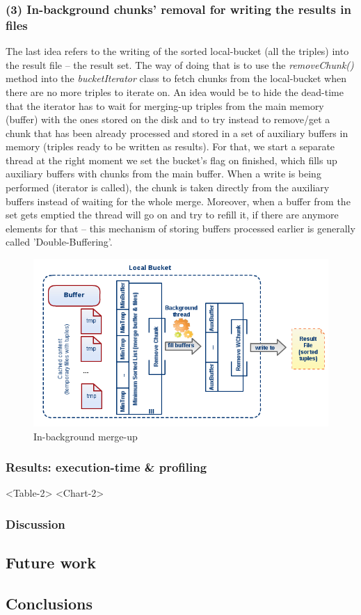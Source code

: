 % 
\subsubsection*{(3) In-background chunks' removal for writing the results in files}

The last idea refers to the writing of the sorted local-bucket (all the triples) into the result file -- the result set. The way of doing that is to use the \textit{removeChunk()} method into the \textit{bucketIterator} class to fetch chunks from the local-bucket when there are no more triples to iterate on. An idea would be to hide the dead-time that the iterator has to wait for merging-up triples from the main memory (buffer) with the ones stored on the disk and to try instead to remove/get a chunk that has been already processed and stored in a set of auxiliary buffers in memory (triples ready to be written as results). For that, we start a separate thread at the right moment we set the bucket's flag on finished, which fills up auxiliary buffers with chunks from the main buffer. When a write is being performed (iterator is called), the chunk is taken directly from the auxiliary buffers instead of waiting for the whole merge. Moreover, when a buffer from the set gets emptied the thread will go on and try to refill it, if there are anymore elements for that -- this mechanism of storing buffers processed earlier is generally called 'Double-Buffering'.

\begin{figure}
\centering
\includegraphics[scale=0.6]{diag5}
\caption{In-background merge-up}
\end{figure}

% 
\subsubsection{Results: execution-time \& profiling}

<Table-2>
<Chart-2>

% 
\subsubsection*{Discussion}

\subsection{Future work}

\subsection{Conclusions}
